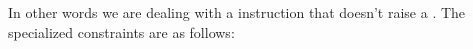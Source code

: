 
\begin{center}
\end{center}
In other words we are dealing with a  instruction that doesn't raise a \suxSH{}.
The specialized constraints are as follows:

